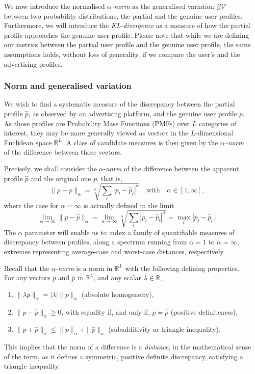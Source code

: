 We now introduce the normalised \emph{$\alpha$-norm} as the generalised variation $\mathcal{GV}$ between two probability distributions, the partial and the genuine user profiles. Furthermore, we will introduce the \emph{KL-divergence} as a measure of how the partial profile approaches the genuine user profile. Please note that while we are defining our metrics between the partial user profile and the genuine user profile, the same assumptions holds, without loss of generality, if we compare the user's and the advertising profiles.

\subsubsection{Norm and generalised variation}

We wish to find a systematic measure of the discrepancy between the partial profile $\hat{p}$, as observed by an advertising platform, and the genuine user profile $p$. As those profiles are Probability Mass Functions (PMFs) over $L$ categories of interest, they may be more generally viewed as vectors in the $L$-dimensional Euclidean space $\mathbb{R}^L$. A class of candidate measures is then given by the $\alpha$--\emph{norm} of the difference between those vectors.

Precisely, we shall consider the $\alpha$-\emph{norm} of the difference between the apparent profile $\hat{p}$ and the original one $p$, that is,
$$ \| p - \hat{p} \|_\alpha = \sqrt[\alpha]{\sum_l{ {| p_l - \hat{p}_l |}^\alpha }} \quad  \text{with} \quad  \alpha \in [1, \infty],$$
where the case for $\alpha = \infty$ is actually defined in the limit
$$\lim_{\alpha\to\infty} \| p - \hat{p} \|_\alpha = \lim_{\alpha\to\infty} \sqrt[\alpha]{\sum_l{ {| p_l - \hat{p}_l |}^\alpha }} = \max_l { | p_l - \hat{p}_l | }.$$
The $\alpha$ parameter will enable us to index a family of quantifiable measures of discrepancy between profiles, along a spectrum running from $\alpha=1$ to $\alpha=\infty$, extremes representing average-case and worst-case distances, respectively.

Recall that the $\alpha$-\emph{norm} is a norm in $\mathbb{R}^L$ with the following defining properties. For any vectors $p$ and $\hat{p}$ in $\mathbb{R}^L$, and any scalar $\lambda\in\mathbb{R}$,
\begin{enumerate}
	\item $\| \lambda p \|_\alpha = |\lambda| \|p\|_\alpha$ (absolute homogeneity),
	\item $ \| p - \hat{p} \|_\alpha \geqslant 0$, with equality if, and only if, $p = \hat{p}$ (positive definiteness),
	\item $\|p+\hat{p}\|_\alpha\leqslant \|p\|_\alpha+\|\hat{p}\|_\alpha$ (subadditivity or triangle inequality).
\end{enumerate}
This implies that the norm of a difference is a \emph{distance}, in the mathematical sense of the term, as it defines a symmetric, positive definite discrepancy, satisfying a triangle inequality.

